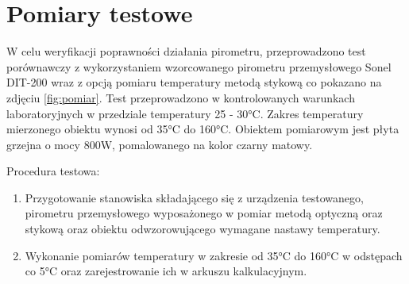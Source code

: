 
\chapter{Pomiary testowe}

W celu weryfikacji poprawności działania pirometru, przeprowadzono test porównawczy z wykorzystaniem wzorcowanego pirometru przemysłowego Sonel DIT-200 wraz z opcją pomiaru temperatury metodą stykową co pokazano na zdjęciu \ref{fig:pomiar}. Test przeprowadzono w kontrolowanych warunkach laboratoryjnych w przedziale temperatury 25 - 30°C. Zakres temperatury mierzonego obiektu wynosi od 35°C do 160°C. Obiektem pomiarowym jest płyta grzejna o mocy 800W, pomalowanego na kolor czarny matowy.

\vspace{12pt}

Procedura testowa:
\begin{enumerate}
\item Przygotowanie stanowiska składającego się z urządzenia testowanego,  pirometru przemysłowego wyposażonego w pomiar metodą optyczną oraz stykową oraz obiektu odwzorowującego wymagane nastawy temperatury. \item Wykonanie pomiarów temperatury w zakresie od 35°C do 160°C w odstępach co 5°C oraz zarejestrowanie ich w arkuszu kalkulacyjnym. %
\end{enumerate}

\newpage


